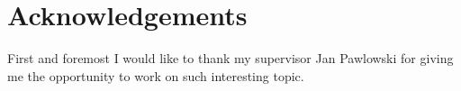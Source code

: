 \chapter*{Acknowledgements}

First and foremost I would like to thank my supervisor Jan Pawlowski for giving me the opportunity to work on such interesting topic. 
\blindtext